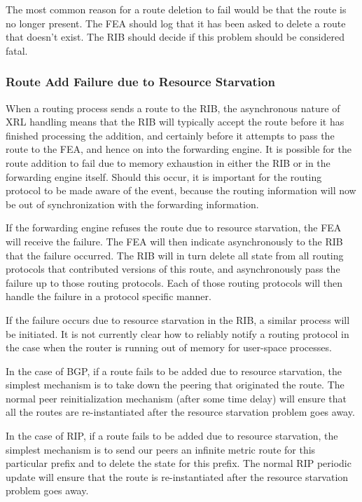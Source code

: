 \documentclass[11pt]{article}
\begin{document}
The most common reason for a route deletion to fail would be that the
route is no longer present. The FEA should log that it has been asked
to delete a route that doesn't exist. The RIB should decide if this
problem should be considered fatal.

\subsubsection{Route Add Failure due to Resource Starvation}

When a routing process sends a route to the RIB, the asynchronous
nature of XRL handling means that the RIB will typically accept the
route before it has finished processing the addition, and certainly
before it attempts to pass the route to the FEA, and hence on into the
forwarding engine.  It is possible for the route addition to fail due
to memory exhaustion in either the RIB or in the forwarding engine
itself.  Should this occur, it is important for the routing protocol
to be made aware of the event, because the routing information will
now be out of synchronization with the forwarding information.

If the forwarding engine refuses the route due to resource starvation,
the FEA will receive the failure.  The FEA will then indicate
asynchronously to the RIB that the failure occurred.  The RIB will in
turn delete all state from all routing protocols that contributed
versions of this route, and asynchronously pass the failure up to
those routing protocols.  Each of those routing protocols will then
handle the failure in a protocol specific manner.

If the failure occurs due to resource starvation in the RIB, a similar
process will be initiated.  It is not currently clear how to reliably
notify a routing protocol in the case when the router is running out
of memory for user-space processes.

In the case of BGP, if a route fails to be added due to resource
starvation, the simplest mechanism is to take down the peering that
originated the route.  The normal peer reinitialization mechanism
(after some time delay) will ensure that all the routes are
re-instantiated after the resource starvation problem goes away.

In the case of RIP, if a route fails to be added due to resource
starvation, the simplest mechanism is to send our peers an infinite
metric route for this particular prefix and to delete the state for
this prefix.  The normal RIP periodic update will ensure that the
route is re-instantiated after the resource starvation problem goes
away.
\end{document}
